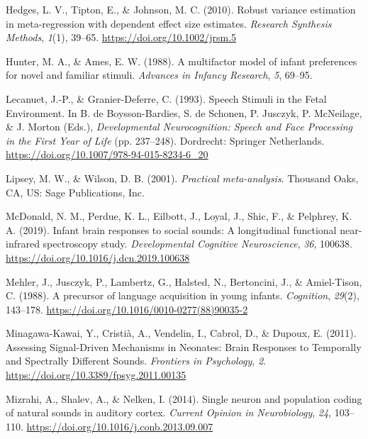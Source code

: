 \documentclass[
  man]{apa6}
\begin{document}
\leavevmode\hypertarget{ref-hedges_robust_2010}{}%
Hedges, L. V., Tipton, E., \& Johnson, M. C. (2010). Robust variance estimation in meta-regression with dependent effect size estimates. \emph{Research Synthesis Methods}, \emph{1}(1), 39--65. \url{https://doi.org/10.1002/jrsm.5}

\leavevmode\hypertarget{ref-hunter_multifactor_1988}{}%
Hunter, M. A., \& Ames, E. W. (1988). A multifactor model of infant preferences for novel and familiar stimuli. \emph{Advances in Infancy Research}, \emph{5}, 69--95.

\leavevmode\hypertarget{ref-lecanuet_speech_1993}{}%
Lecanuet, J.-P., \& Granier-Deferre, C. (1993). Speech Stimuli in the Fetal Environment. In B. de Boysson-Bardies, S. de Schonen, P. Jusczyk, P. McNeilage, \& J. Morton (Eds.), \emph{Developmental Neurocognition: Speech and Face Processing in the First Year of Life} (pp. 237--248). Dordrecht: Springer Netherlands. \url{https://doi.org/10.1007/978-94-015-8234-6_20}

\leavevmode\hypertarget{ref-lipsey_practical_2001}{}%
Lipsey, M. W., \& Wilson, D. B. (2001). \emph{Practical meta-analysis}. Thousand Oaks, CA, US: Sage Publications, Inc.

\leavevmode\hypertarget{ref-mcdonald_infant_2019}{}%
McDonald, N. M., Perdue, K. L., Eilbott, J., Loyal, J., Shic, F., \& Pelphrey, K. A. (2019). Infant brain responses to social sounds: A longitudinal functional near-infrared spectroscopy study. \emph{Developmental Cognitive Neuroscience}, \emph{36}, 100638. \url{https://doi.org/10.1016/j.dcn.2019.100638}

\leavevmode\hypertarget{ref-mehler_precursor_1988}{}%
Mehler, J., Jusczyk, P., Lambertz, G., Halsted, N., Bertoncini, J., \& Amiel-Tison, C. (1988). A precursor of language acquisition in young infants. \emph{Cognition}, \emph{29}(2), 143--178. \url{https://doi.org/10.1016/0010-0277(88)90035-2}

\leavevmode\hypertarget{ref-minagawa-kawai_assessing_2011}{}%
Minagawa-Kawai, Y., Cristià, A., Vendelin, I., Cabrol, D., \& Dupoux, E. (2011). Assessing Signal-Driven Mechanisms in Neonates: Brain Responses to Temporally and Spectrally Different Sounds. \emph{Frontiers in Psychology}, \emph{2}. \url{https://doi.org/10.3389/fpsyg.2011.00135}

\leavevmode\hypertarget{ref-mizrahi_single_2014}{}%
Mizrahi, A., Shalev, A., \& Nelken, I. (2014). Single neuron and population coding of natural sounds in auditory cortex. \emph{Current Opinion in Neurobiology}, \emph{24}, 103--110. \url{https://doi.org/10.1016/j.conb.2013.09.007}
\end{document}
